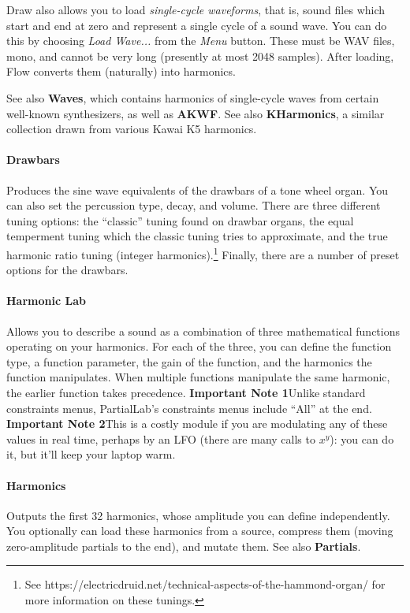 \documentclass{article}
\begin{document}
Draw also allows you to load {\it single-cycle waveforms}, that is, sound files which start and end at zero and represent a single cycle of a sound wave.  You can do this by choosing {\it Load Wave...} from the {\it Menu} button.  These must be WAV files, mono, and cannot be very long (presently at most 2048 samples).  After loading, Flow converts them (naturally) into harmonics.

See also {\bf Waves}, which contains harmonics of single-cycle waves from certain well-known synthesizers, as well as {\bf AKWF}.  See also {\bf KHarmonics}, a similar collection drawn from various Kawai K5 harmonics.

\paragraph{Drawbars}   Produces the sine wave equivalents of the drawbars of a tone wheel organ.  You can also set the percussion type, decay, and volume.  There are three different tuning options: the ``classic'' tuning found on drawbar organs, the equal temperment tuning which the classic tuning tries to approximate, and the true harmonic ratio tuning (integer harmonics).\footnote{See https:/\!/electricdruid.net/technical-aspects-of-the-hammond-organ/ for more information on these tunings.}  Finally, there are a number of preset options for the drawbars.

\paragraph{Harmonic Lab}  Allows you to describe a sound as a combination of three mathematical functions operating on your harmonics.  For each of the three, you can define the function type, a function parameter, the gain of the function, and the harmonics the function manipulates.  When multiple functions manipulate the same harmonic, the earlier function takes precedence.  {\bf Important Note 1}\quad Unlike standard constraints menus, PartialLab's constraints menus include ``All'' at the end.  {\bf Important Note 2}\quad This is a costly module if you are modulating any of these values in real time, perhaps by an LFO (there are many calls to \(x^y\)): you can do it, but it'll keep your laptop warm.

\paragraph{Harmonics}  Outputs the first 32 harmonics, whose amplitude you can define independently.  You optionally can load these harmonics from a source, compress them (moving zero-amplitude partials to the end), and mutate them. See also {\bf Partials}.
\end{document}
